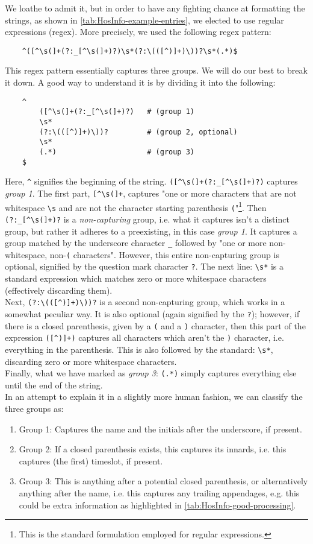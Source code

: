 We loathe to admit it, but in order to have any fighting chance at formatting the strings, as shown in \autoref{tab:HosInfo-example-entries}, we elected to use regular expressions (regex). More precisely, we used the following regex pattern:
\begin{verbatim}
    ^([^\s(]+(?:_[^\s(]+)?)\s*(?:\(([^)]+)\))?\s*(.*)$
\end{verbatim}
This regex pattern essentially captures three groups. We will do our best to break it down. A good way to understand it is by dividing it into the following:
\begin{verbatim}
    ^
        ([^\s(]+(?:_[^\s(]+)?)   # (group 1)
        \s*
        (?:\(([^)]+)\))?         # (group 2, optional)
        \s*
        (.*)                     # (group 3)
    $
\end{verbatim}
Here, \verb|^| signifies the beginning of the string. \verb|([^\s(]+(?:_[^\s(]+)?)| captures \emph{group 1}. The first part, \verb|[^\s(]+|, captures "one or more characters that are not whitespace \verb|\s| and are not the character starting parenthesis \verb|(|"\footnote{This is the standard formulation employed for regular expressions.}. Then \verb|(?:_[^\s(]+)?| is a \emph{non-capturing} group, i.e. what it captures isn't a distinct group, but rather it adheres to a preexisting, in this case \emph{group 1}. It captures a group matched by the underscore character \verb|_| followed by "one or more non-whitespace, non-\verb|(| characters". However, this entire non-capturing group is optional, signified by the question mark character \verb|?|. The next line: \verb|\s*| is a standard expression which matches zero or more whitespace characters (effectively discarding them).
\\
Next, \verb|(?:\(([^)]+)\))?| is a second non-capturing group, which works in a somewhat peculiar way. It is also optional (again signified by the \verb|?|); however, if there is a closed parenthesis, given by a \verb|(| and a \verb|)| character, then this part of the expression \verb|([^)]+)| captures all characters which aren't the \verb|)| character, i.e. everything in the parenthesis. This is also followed by the standard: \verb|\s*|, discarding zero or more whitespace characters.
\\
Finally, what we have marked as \emph{group 3}: \verb|(.*)| simply captures everything else until the end of the string.
\\
In an attempt to explain it in a slightly more human fashion, we can classify the three groups as:
\begin{enumerate}
	\item Group 1: Captures the name and the initials after the underscore, if present.
	\item Group 2: If a closed parenthesis exists, this captures its innards, i.e. this captures (the first) timeslot, if present.
	\item Group 3: This is anything after a potential closed parenthesis, or alternatively anything after the name, i.e. this captures any trailing appendages, e.g. this could be extra information as highlighted in \autoref{tab:HosInfo-good-processing}.
\end{enumerate}
